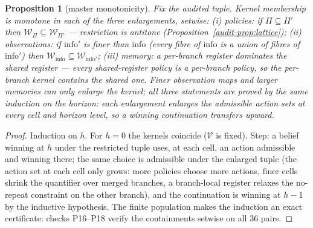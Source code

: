 \documentclass[10pt,twocolumn]{article}
\theoremstyle{plain}
\newtheorem{proposition}[theorem]{Proposition}
\theoremstyle{definition}
\theoremstyle{remark}
\begin{document}
\begin{proposition}[master monotonicity]\label{audit-prop:master}
Fix the audited tuple. Kernel membership is monotone in each of the
three enlargements, setwise: (i) \emph{policies}: if
\(\Pi \subseteq \Pi'\) then
\(\mathcal{W}_{\Pi} \subseteq \mathcal{W}_{\Pi'}\) --- restriction is
antitone (Proposition~\ref{audit-prop:lattice}); (ii) \emph{observations}:
if \(\mathrm{info}'\) is finer than \(\mathrm{info}\) (every fibre of
\(\mathrm{info}\) is a union of fibres of \(\mathrm{info}'\)) then
\(\mathcal{W}_{\mathrm{info}} \subseteq
\mathcal{W}_{\mathrm{info}'}\); (iii) \emph{memory}: a per-branch
register dominates the shared register --- every shared-register policy
is a per-branch policy, so the per-branch kernel contains the shared
one. Finer observation maps and larger memories can only enlarge the
kernel; all three statements are proved by the same induction on the
horizon: each enlargement enlarges the admissible action sets at every
cell and horizon level, so a winning continuation transfers upward.
\end{proposition}

\begin{proof}
Induction on \(h\). For \(h = 0\) the kernels coincide
(\(\mathcal{V}\) is fixed). Step: a belief winning at \(h\) under the
restricted tuple uses, at each cell, an action admissible and winning
there; the same choice is admissible under the enlarged tuple (the
action set at each cell only grows: more policies choose more actions,
finer cells shrink the quantifier over merged branches, a branch-local
register relaxes the no-repeat constraint on the other branch), and the
continuation is winning at \(h-1\) by the inductive hypothesis. The
finite population makes the induction an exact certificate: checks
P16--P18 verify the containments setwise on all \(36\) pairs.
\end{proof}
\end{document}
